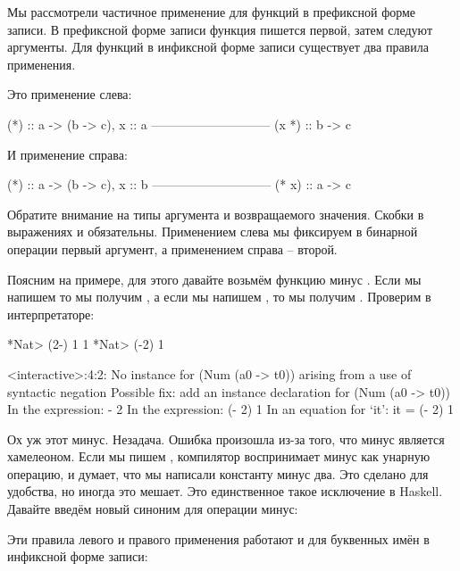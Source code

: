 Мы рассмотрели частичное применение для функций 
в префиксной форме записи. В префиксной форме записи функция пишется первой,
затем следуют аргументы. Для функций в инфиксной форме записи
существует два правила применения. 

Это применение слева:

\begin{code}
                    (*) :: a -> (b -> c),   x :: a
                    -----------------------------
                            (x *) :: b -> c
\end{code}

И применение справа:

\begin{code}
                    (*) :: a -> (b -> c),   x :: b
                    -----------------------------
                            (* x) :: a -> c
\end{code}

Обратите внимание на типы аргумента и возвращаемого значения. 
Скобки в выражениях  и  обязательны. Применением
слева мы фиксируем в бинарной операции первый аргумент, а применением
справа -- второй.

Поясним на примере, для этого давайте возьмём функцию минус \In{(-)}.
Если мы напишем  то мы получим , а если мы напишем
, то мы получим . Проверим в интерпретаторе:

\begin{code}
*Nat> (2-) 1
1
*Nat> (-2) 1

<interactive>:4:2:
    No instance for (Num (a0 -> t0))
      arising from a use of syntactic negation
    Possible fix: add an instance declaration for (Num (a0 -> t0))
    In the expression: - 2
    In the expression: (- 2) 1
    In an equation for `it': it = (- 2) 1

\end{code}

Ох уж этот минус. Незадача. Ошибка произошла из-за того,
что минус является хамелеоном. Если мы пишем , компилятор
воспринимает минус как унарную операцию, и думает, что мы написали
константу минус два. Это сделано для удобства, но иногда это мешает.
Это единственное такое исключение в Haskell. Давайте введём новый
синоним для операции минус:



Эти правила левого и правого применения работают и для
буквенных имён в инфиксной форме записи:

